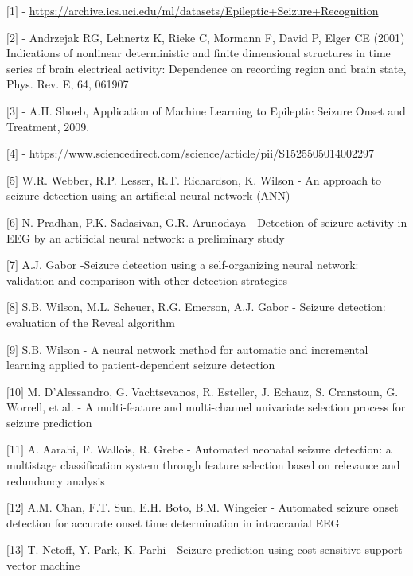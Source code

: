 \documentclass{llncs}       %
\begin{document}
\begin{thebibliography}{}
%
%



$[$1$]$ - \underline{
https://archive.ics.uci.edu/ml/datasets/Epileptic+Seizure+Recognition}

$[$2$]$ - Andrzejak RG, Lehnertz K, Rieke C, Mormann F, David P, Elger 
CE (2001) Indications of nonlinear deterministic and finite dimensional 
structures in time series of brain electrical activity: Dependence on 
recording region and brain state, Phys. Rev. E, 64, 061907

$[$3$]$ - A.H. Shoeb, Application of Machine Learning to Epileptic 
Seizure Onset and Treatment, 2009.

$[$4$]$ - 
https://www.sciencedirect.com/science/article/pii/S1525505014002297

$[$5$]$ W.R. Webber, R.P. Lesser, R.T. Richardson, K. Wilson - An 
approach to seizure detection using an artificial neural network (ANN)

$[$6$]$ N. Pradhan, P.K. Sadasivan, G.R. Arunodaya - Detection of 
seizure activity in EEG by an artificial neural network: a preliminary 
study

$[$7$]$ A.J. Gabor -Seizure detection using a self-organizing neural 
network: validation and comparison with other detection strategies

$[$8$]$ S.B. Wilson, M.L. Scheuer, R.G. Emerson, A.J. Gabor - Seizure 
detection: evaluation of the Reveal algorithm

$[$9$]$ S.B. Wilson - A neural network method for automatic and 
incremental learning applied to patient-dependent seizure detection

$[$10$]$ M. D'Alessandro, G. Vachtsevanos, R. Esteller, J. Echauz, S. 
Cranstoun, G. Worrell, et al. - A multi-feature and multi-channel 
univariate selection process for seizure prediction

$[$11$]$ A. Aarabi, F. Wallois, R. Grebe - Automated neonatal seizure 
detection: a multistage classification system through feature selection 
based on relevance and redundancy analysis

$[$12$]$ A.M. Chan, F.T. Sun, E.H. Boto, B.M. Wingeier - Automated 
seizure onset detection for accurate onset time determination in 
intracranial EEG

$[$13$]$ T. Netoff, Y. Park, K. Parhi - Seizure prediction using 
cost-sensitive support vector machine


\end{thebibliography}
\end{document}
